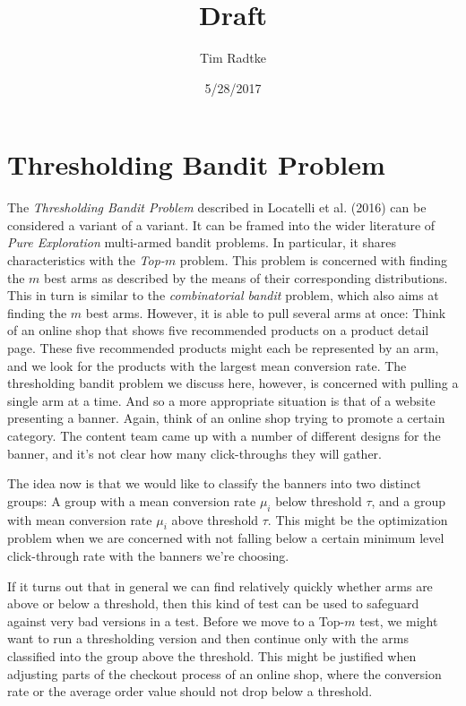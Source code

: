 \documentclass[12pt,]{article}
\title{Draft}
\author{Tim Radtke}
\date{5/28/2017}
\begin{document}
\maketitle

{
\hypersetup{linkcolor=black}
\setcounter{tocdepth}{3}
\tableofcontents
}
\section{Thresholding Bandit Problem}\label{thresholding-bandit-problem}

The \emph{Thresholding Bandit Problem} described in Locatelli et al.
(2016) can be considered a variant of a variant. It can be framed into
the wider literature of \emph{Pure Exploration} multi-armed bandit
problems. In particular, it shares characteristics with the
\emph{Top-\(m\)} problem. This problem is concerned with finding the
\(m\) best arms as described by the means of their corresponding
distributions. This in turn is similar to the \emph{combinatorial
bandit} problem, which also aims at finding the \(m\) best arms.
However, it is able to pull several arms at once: Think of an online
shop that shows five recommended products on a product detail page.
These five recommended products might each be represented by an arm, and
we look for the products with the largest mean conversion rate. The
thresholding bandit problem we discuss here, however, is concerned with
pulling a single arm at a time. And so a more appropriate situation is
that of a website presenting a banner. Again, think of an online shop
trying to promote a certain category. The content team came up with a
number of different designs for the banner, and it's not clear how many
click-throughs they will gather.

The idea now is that we would like to classify the banners into two
distinct groups: A group with a mean conversion rate \(\mu_i\) below
threshold \(\tau\), and a group with mean conversion rate \(\mu_i\)
above threshold \(\tau\). This might be the optimization problem when we
are concerned with not falling below a certain minimum level
click-through rate with the banners we're choosing.

If it turns out that in general we can find relatively quickly whether
arms are above or below a threshold, then this kind of test can be used
to safeguard against very bad versions in a test. Before we move to a
Top-\(m\) test, we might want to run a thresholding version and then
continue only with the arms classified into the group above the
threshold. This might be justified when adjusting parts of the checkout
process of an online shop, where the conversion rate or the average
order value should not drop below a threshold.
\end{document}

